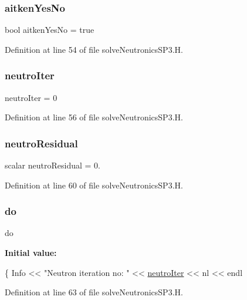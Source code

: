 \subsubsection{\texorpdfstring{aitken\+Yes\+No}{aitkenYesNo}}
{\footnotesize\ttfamily bool aitken\+Yes\+No = true}



Definition at line 54 of file solve\+Neutronics\+S\+P3.\+H.

\mbox{\label{solveNeutronicsSP3_8H_a5ea48e0170faff29dfdd3cbba330d51d}} 
\subsubsection{\texorpdfstring{neutro\+Iter}{neutroIter}}
{\footnotesize\ttfamily neutro\+Iter = 0}



Definition at line 56 of file solve\+Neutronics\+S\+P3.\+H.

\mbox{\label{solveNeutronicsSP3_8H_a2a3baa00ecfd5a47c6f6ba475a66d2c6}} 
\subsubsection{\texorpdfstring{neutro\+Residual}{neutroResidual}}
{\footnotesize\ttfamily scalar neutro\+Residual = 0.}



Definition at line 60 of file solve\+Neutronics\+S\+P3.\+H.

\mbox{\label{solveNeutronicsSP3_8H_a721c6ff80a6d3e4ad4ffa52a04c60085}} 
\subsubsection{\texorpdfstring{do}{do}}
{\footnotesize\ttfamily do}

{\bfseries Initial value\+:}
\begin{DoxyCode}
\{
    Info << \textcolor{stringliteral}{"Neutron iteration no:  "} << \hyperlink{solveNeutronicsSP3_8H_a5ea48e0170faff29dfdd3cbba330d51d}{neutroIter} << nl << endl
\end{DoxyCode}


Definition at line 63 of file solve\+Neutronics\+S\+P3.\+H.

